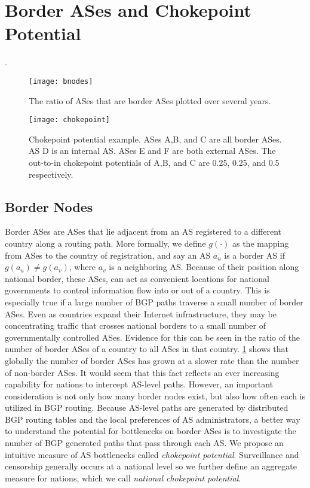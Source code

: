 \section{Border ASes and Chokepoint Potential}

.

\begin{figure}
	\centering
	\texttt{[image: bnodes]}
	\caption{The ratio of ASes that are border ASes plotted over several years.}\label{fig:bnodes}
\end{figure}

\begin{figure}
	\centering
	\texttt{[image: chokepoint]}
	\caption{Chokepoint potential example. ASes A,B, and C are all border ASes. 
						AS D is an internal AS. ASes E and F are both external ASes.
						The out-to-in chokepoint potentials of A,B, and C are 0.25, 0.25, and 0.5 respectively.}\label{fig:chokepoint}
\end{figure}

\subsection{Border Nodes}

Border ASes are ASes that lie adjacent from an AS registered to a different
country along a routing path. More formally, we define $g(\cdot)$ as the
mapping from ASes to the country of registration, and say an AS $a_u$ is a border
AS if $g(a_u) \neq g(a_v)$, where $a_v$ is a neighboring AS.  Because of their
position along national border, these ASes, can act as convenient locations for
national governments to control information flow into or out of a country. This
is especially true if a large number of BGP paths traverse a small number of
border ASes. Even as countries expand their Internet infrastructure, they may
be concentrating traffic that crosses national borders to a small number of
governmentally controlled ASes.  Evidence for this can be seen in the ratio of
the number of border ASes of a country to all ASes in that country.
\figurename \ref{fig:bnodes} shows that globally the number of border ASes has
grown at a slower rate than the number of non-border ASes.
It would seem that this fact reflects an ever increasing capability for nations
to intercept AS-level paths.  However, an important consideration is not only
how many border nodes exist, but also how often each is utilized in BGP
routing. Because AS-level paths are generated by distributed BGP routing tables
and the local preferences of AS administrators, a better way to understand the
potential for bottlenecks on border ASes is to investigate the number of BGP
generated paths that pass through each AS. We propose an intuitive measure of
AS bottlenecks called \emph{chokepoint potential}. Surveillance and censorship
generally occurs at a national level so we further define an aggregate measure
for nations, which we call \emph{national chokepoint potential}.

